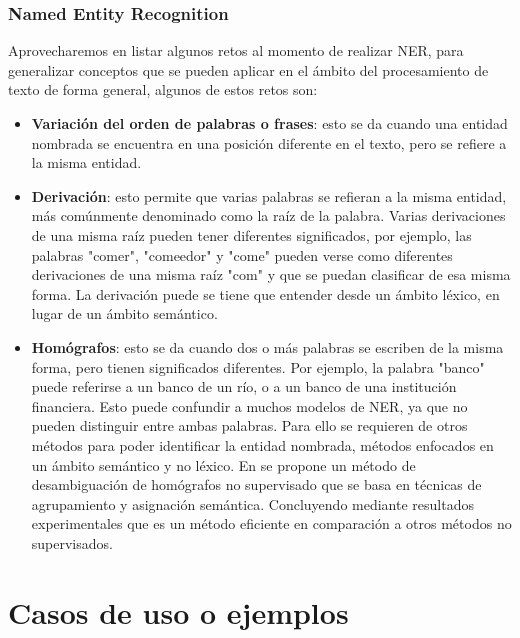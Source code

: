 \documentclass[conference]{IEEEtran}
\begin{document}
\subsubsection{Named Entity Recognition}\label{subsubsec:NER}
Aprovecharemos en listar algunos retos al momento de realizar NER, para generalizar conceptos que se pueden aplicar en el ámbito del procesamiento de texto de forma general, algunos de estos retos son: 
\begin{itemize}
  \item \textbf{Variación del orden de palabras o frases}: esto se da cuando una entidad nombrada se encuentra en una posición diferente en el texto, pero se refiere a la misma entidad.
  \item \textbf{Derivación}: esto permite que varias palabras se refieran a la misma entidad, más comúnmente denominado como la raíz de la palabra. Varias derivaciones de una misma raíz pueden tener diferentes significados, por ejemplo, las palabras "comer", "comeedor" y "come" pueden verse como diferentes derivaciones de una misma raíz "com" y que se puedan clasificar de esa misma forma.
  La derivación puede se tiene que entender desde un ámbito léxico, en lugar de un ámbito semántico.
  \item \textbf{Homógrafos}: esto se da cuando dos o más palabras se escriben de la misma forma, pero tienen significados diferentes. Por ejemplo, la palabra "banco" puede referirse a un banco de un río, o a un banco de una institución financiera. Esto puede confundir a muchos modelos de NER, ya que no pueden distinguir entre ambas palabras. Para ello se requieren de otros métodos para poder identificar la entidad nombrada, métodos enfocados en un ámbito semántico y no léxico. En \cite{b18} se propone un método de desambiguación de homógrafos no supervisado que se basa en técnicas de agrupamiento y asignación semántica. Concluyendo mediante resultados experimentales que es un método eficiente en comparación a otros métodos no supervisados.

\end{itemize}



%
%

\section{Casos de uso o ejemplos}
\end{document}
